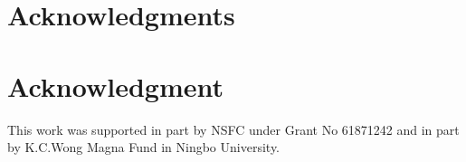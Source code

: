 \documentclass[9pt,journal,compsoc]{IEEEtran}
\begin{document}
\vspace{-2ex}
\ifCLASSOPTIONcompsoc
  \section*{Acknowledgments}
\else
  \section*{Acknowledgment}
\fi
This work was supported in part by NSFC under Grant No 61871242 and in part by K.C.Wong Magna Fund in Ningbo University.
\vspace{-2ex}
\ifCLASSOPTIONcaptionsoff
  \newpage
\fi
\tiny


\end{document}
